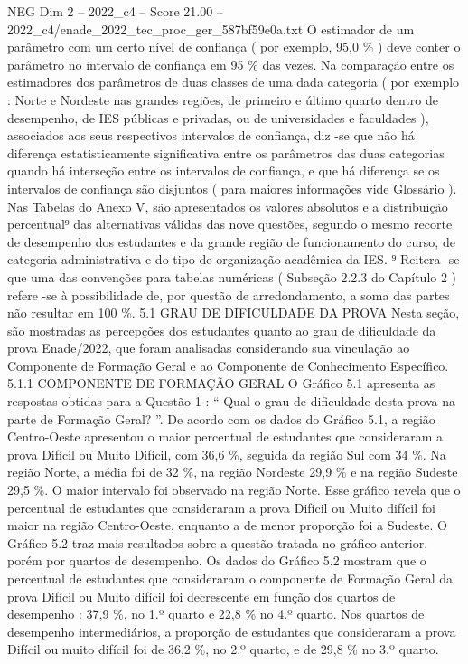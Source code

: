 \begin{textsample}{NEG Dim 2 – 2022\_c4 – Score 21.00 – 2022\_c4/enade\_2022\_tec\_proc\_ger\_587bf59e0a.txt}
O estimador de um parâmetro com um certo nível de confiança ( por exemplo, 95,0 \% ) deve conter o parâmetro no intervalo de confiança em 95 \% das vezes.
Na comparação entre os estimadores dos parâmetros de duas classes de uma dada categoria ( por exemplo : Norte e Nordeste nas grandes regiões, de primeiro e último quarto dentro de desempenho, de IES públicas e privadas, ou de universidades e faculdades ), associados aos seus respectivos intervalos de confiança, diz -se que não há diferença estatisticamente significativa entre os parâmetros das duas categorias quando há interseção entre os intervalos de confiança, e que há diferença se os intervalos de confiança são disjuntos ( para maiores informações vide Glossário ).
Nas Tabelas do Anexo V, são apresentados os valores absolutos e a distribuição percentual⁹ das alternativas válidas das nove questões, segundo o mesmo recorte de desempenho dos estudantes e da grande região de funcionamento do curso, de categoria administrativa e do tipo de organização acadêmica da IES. ⁹ Reitera -se que uma das convenções para tabelas numéricas ( Subseção 2.2.3 do Capítulo 2 ) refere -se à possibilidade de, por questão de arredondamento, a soma das partes não resultar em 100 \%. 5.1 GRAU DE DIFICULDADE DA PROVA Nesta seção, são mostradas as percepções dos estudantes quanto ao grau de dificuldade da prova Enade/2022, que foram analisadas considerando sua vinculação ao Componente de Formação Geral e ao Componente de Conhecimento Específico. 5.1.1 COMPONENTE DE FORMAÇÃO GERAL O Gráfico 5.1 apresenta as respostas obtidas para a Questão 1 : “ Qual o grau de dificuldade desta prova na parte de Formação Geral? ”.
De acordo com os dados do Gráfico 5.1, a região Centro-Oeste apresentou o maior percentual de estudantes que consideraram a prova Difícil ou Muito Difícil, com 36,6 \%, seguida da região Sul com 34 \%.
Na região Norte, a média foi de 32 \%, na região Nordeste 29,9 \% e na região Sudeste 29,5 \%.
O maior intervalo foi observado na região Norte.
Esse gráfico revela que o percentual de estudantes que consideraram a prova Difícil ou Muito difícil foi maior na região Centro-Oeste, enquanto a de menor proporção foi a Sudeste.
O Gráfico 5.2 traz mais resultados sobre a questão tratada no gráfico anterior, porém por quartos de desempenho.
Os dados do Gráfico 5.2 mostram que o percentual de estudantes que consideraram o componente de Formação Geral da prova Difícil ou Muito difícil foi decrescente em função dos quartos de desempenho : 37,9 \%, no 1.º quarto e 22,8 \% no 4.º quarto.
Nos quartos de desempenho intermediários, a proporção de estudantes que consideraram a prova Difícil ou muito difícil foi de 36,2 \%, no 2.º quarto, e de 29,8 \% no 3.º quarto.

\end{textsample}
